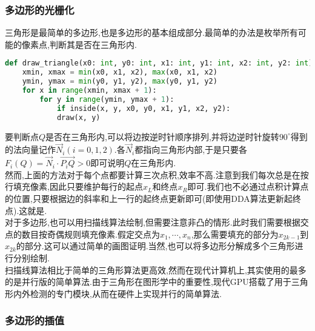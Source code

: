 \documentclass{ctexart}
\begin{document}
\subsubsection{多边形的光栅化}
三角形是最简单的多边形,也是多边形的基本组成部分.最简单的办法是枚举所有可能的像素点,判断其是否在三角形内.
\begin{lstlisting}[language=Python]
def draw_triangle(x0: int, y0: int, x1: int, y1: int, x2: int, y2: int):
    xmin, xmax = min(x0, x1, x2), max(x0, x1, x2)
    ymin, ymax = min(y0, y1, y2), max(y0, y1, y2)
    for x in range(xmin, xmax + 1):
        for y in range(ymin, ymax + 1):
            if inside(x, y, x0, y0, x1, y1, x2, y2):
            draw(x, y)
\end{lstlisting}
要判断点$Q$是否在三角形内,可以将边按逆时针顺序排列,并将边逆时针旋转$90^\circ$得到的法向量记作$\vec{N}_i(i=0,1,2)$.各$\vec{N}_i$都指向三角形内部,于是只要各$F_i(Q)=\vec{N}_i\cdot\overrightarrow{P_iQ}>0$即可说明$Q$在三角形内.\\
\indent 然而,上面的方法对于每个点都要计算三次点积,效率不高.注意到我们每次总是在按行填充像素,因此只要维护每行的起点$x_L$和终点$x_R$即可.我们也不必通过点积计算点的位置,只要根据边的斜率和上一行的起终点更新即可(即使用DDA算法更新起终点).这就是.\\
\indent 对于多边形,也可以用扫描线算法绘制,但需要注意非凸的情形.此时我们需要根据交点的数目按奇偶规则填充像素.假定交点为$x_1,\cdots,x_n$,那么需要填充的部分为$x_{2k-1}$到$x_{2k}$的部分.这可以通过简单的画图证明.当然,也可以将多边形分解成多个三角形进行分别绘制.\\
\indent 扫描线算法相比于简单的三角形算法更高效,然而在现代计算机上,其实使用的最多的是并行版的简单算法.由于三角形在图形学中的重要性,现代GPU搭载了用于三角形内外检测的专门模块,从而在硬件上实现并行的简单算法.
\subsubsection{多边形的插值}
\end{document}
